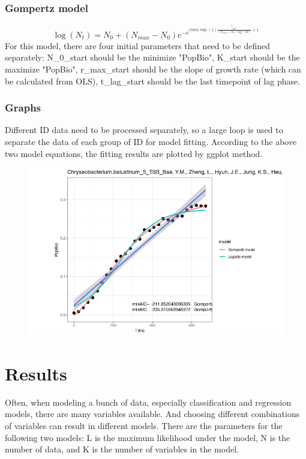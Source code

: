 \documentclass[11pt]{article}
\begin{document}
        \subsubsection{Gompertz model}
        \begin{equation}
            \log (N_{t})=N_{0} + (N_{max}-N_{0})e^{-e^{rmax\exp (1)\frac{t_{lag^{-t}}}{(N_{max}-N_{0})\log (10)}+1}}
        \end{equation}
        For this model, there are four initial parameters that need to be defined separately: N\_0\_start should be the minimize "PopBio", K\_start should be the maximize "PopBio", r\_max\_start should be the slope of growth rate (which can be calculated from OLS), t\_lag\_start should be the last timepoint of lag phase.
        \subsubsection{Graphs}
        Different ID data need to be processed separately, so a large loop is used to separate the data of each group of ID for model fitting. According to the above two model equations, the fitting results are plotted by ggplot method.
        \begin{figure}
          \centering
          \includegraphics[width=.8\textwidth]{../results/Rplot.png}
        \end{figure}
        
  \section{Results}
    Often, when modeling a bunch of data, especially classification and regression models, there are many variables available. And choosing different combinations of variables can result in different models.
    There are the parameters for the following two models: L is the maximum likelihood under the model, N is the number of data, and K is the number of variables in the model.
\end{document}
